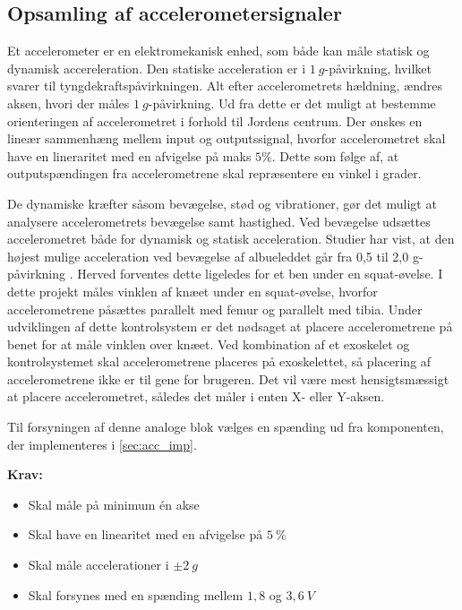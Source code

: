 \subsection{Opsamling af accelerometersignaler} \label{sec:acc_teori}
Et accelerometer er en elektromekanisk enhed, som både kan måle statisk og dynamisk accereleration. 
Den statiske acceleration er i $1~g$-påvirkning, hvilket svarer til tyngdekraftspåvirkningen. 
Alt efter accelerometrets hældning, ændres aksen, hvori der måles $1~g$-påvirkning. 
Ud fra dette er det muligt at bestemme orienteringen af accelerometret i forhold til Jordens centrum. 
Der ønskes en lineær sammenhæng mellem input og outputssignal, hvorfor accelerometret skal have en lineraritet med en afvigelse på maks $5\%$. Dette som følge af, at outputspændingen fra accelerometrene skal repræsentere en vinkel i grader.

De dynamiske kræfter såsom bevægelse, stød og vibrationer, gør det muligt at analysere accelerometrets bevægelse samt hastighed. 
Ved bevægelse udsættes accelerometret både for dynamisk og statisk acceleration. 
Studier har vist, at den højest mulige acceleration ved bevægelse af albueleddet går fra 0,5 til 2,0 g-påvirkning \citep{bernmarka2002}. 
Herved forventes dette ligeledes for et ben under en squat-øvelse. 
I dette projekt måles vinklen af knæet under en squat-øvelse, hvorfor accelerometrene påsættes parallelt med femur og parallelt med tibia. Under udviklingen af dette kontrolsystem er det nødsaget at placere accelerometrene på benet for at måle vinklen over knæet. Ved kombination af et exoskelet og kontrolsystemet skal accelerometrene placeres på exoskelettet, så placering af accelerometrene ikke er til gene for brugeren. 
Det vil være mest hensigtsmæssigt at placere accelerometret, således det måler i enten X- eller Y-aksen. 

Til forsyningen af denne analoge blok vælges en spænding ud fra komponenten, der implementeres i \autoref{sec:acc_imp}.



\vspace{3mm}
\textbf{Krav:}
\begin{itemize}
\item Skal måle på minimum én akse
\item Skal have en linearitet med en afvigelse på $5~\%$
\item Skal måle accelerationer i $\pm 2~g$
\item Skal forsynes med en spænding mellem $1,8$ og $3,6~V$
\end{itemize}
